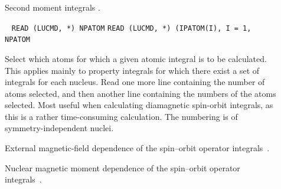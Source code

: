 \begin{description}
\item[] Second moment integrals
.


\item[]\verb| |\newline
\verb|READ (LUCMD, *) NPATOM|\newline
\verb|READ (LUCMD, *) (IPATOM(I), I = 1, NPATOM|

Select which atoms for which a given atomic integral is to be
calculated. This applies mainly to property integrals for which
there exist a set of integrals for each nucleus. Read one more line
containing the number of atoms selected, and then another line
containing the numbers of the atoms selected. Most useful when
calculating diamagnetic spin-orbit
integrals, as this is a rather time-consuming calculation. The
numbering is of symmetry-independent nuclei.

\item[] External magnetic-field dependence of the spin--orbit
operator integrals~\cite{jvkrovjcp111}.


\item[] Nuclear magnetic moment dependence of the spin--orbit
operator integrals~\cite{jvkrovjcc20}.



\end{description}
